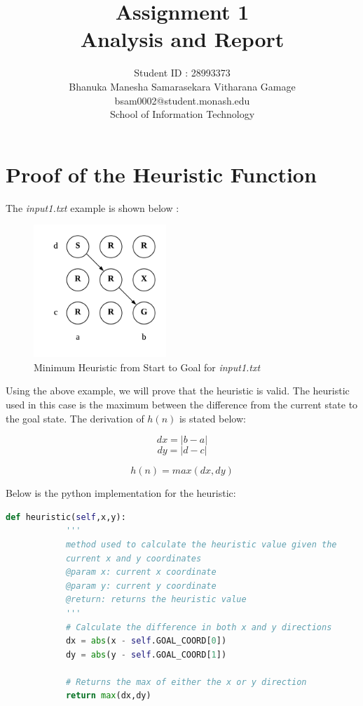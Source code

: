 \documentclass{article}
\title{Assignment 1 \\
		Analysis and Report}
\author{Student ID : 28993373\\
	Bhanuka Manesha Samarasekara Vitharana Gamage\\
	bsam0002@student.monash.edu\\
	School of Information Technology}
\begin{document}
	\lstset{language=Python}   
	\maketitle
	
	\section{Proof of the Heuristic Function}
	
	The \emph{input1.txt} example is shown below :
	
	\begin{figure}[!h]
		\centering
		\includegraphics[width=50mm]{img1.png}
		\caption{Minimum Heuristic from Start to Goal for \emph{input1.txt}}
		\label{fig:img1}
	\end{figure}
	
	Using the above example, we will prove that the heuristic is valid. The heuristic used in this case is the maximum between the difference from the current state to the goal state. The derivation of $h(n)$ is stated below:
	
	\begin{equation} 
		dx = | b - a | \label{equation:2}
	\end{equation}
	\begin{equation} 
		dy = | d - c | \label{equation:3}
	\end{equation}
	
	\begin{equation}
		h(n) = max(dx,dy) \label{equation:4}
	\end{equation}
	
	Below is the python implementation for the heuristic:

		\newpage
		\begin{lstlisting}[language=Python]
		def heuristic(self,x,y):
			'''
			method used to calculate the heuristic value given the 
			current x and y coordinates
			@param x: current x coordinate
			@param y: current y coordinate
			@return: returns the heuristic value
			'''
			# Calculate the difference in both x and y directions
			dx = abs(x - self.GOAL_COORD[0])
			dy = abs(y - self.GOAL_COORD[1])
			
			# Returns the max of either the x or y direction
			return max(dx,dy)
		\end{lstlisting}
\end{document}

